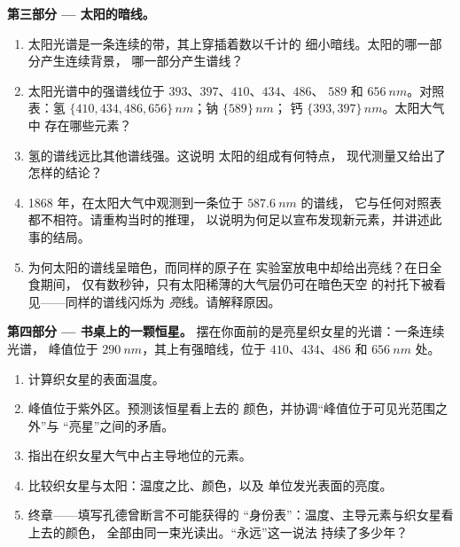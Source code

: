 \begin{problem}
\medskip
\noindent\textbf{第三部分 --- 太阳的暗线。}
\begin{enumerate}[resume]
  \item 太阳光谱是一条连续的带，其上穿插着数以千计的
        细小暗线。太阳的哪一部分产生连续背景，
        哪一部分产生谱线？
  \item 太阳光谱中的强谱线位于 $393$、$397$、$410$、$434$、$486$、
        $589$ 和 $\qty{656}{nm}$。对照表：氢
        $\{410, 434, 486, 656\}\,\unit{nm}$；钠 $\{589\}\,\unit{nm}$；
        钙 $\{393, 397\}\,\unit{nm}$。太阳大气中
        存在哪些元素？
  \item 氢的谱线远比其他谱线强。这说明
        太阳的组成有何特点，
        现代测量又给出了怎样的结论？
  \item 1868 年，在太阳大气中观测到一条位于 $\qty{587.6}{nm}$ 的谱线，
        它与任何对照表都不相符。请重构当时的推理，
        以说明为何足以宣布发现新元素，并讲述此事的结局。
  \item 为何太阳的谱线呈暗色，而同样的原子在
        实验室放电中却给出亮线？在日全食期间，
        仅有数秒钟，只有太阳稀薄的大气层仍可在暗色天空
        的衬托下被看见——同样的谱线闪烁为
        \emph{亮}线。请解释原因。
\end{enumerate}

\medskip
\noindent\textbf{第四部分 --- 书桌上的一颗恒星。}
摆在你面前的是亮星织女星的光谱：一条连续光谱，
峰值位于 $\qty{290}{nm}$，其上有强暗线，位于
$410$、$434$、$486$ 和 $\qty{656}{nm}$ 处。
\begin{enumerate}[resume]
  \item 计算织女星的表面温度。
  \item 峰值位于紫外区。预测该恒星看上去的
        颜色，并协调“峰值位于可见光范围之外”与
        “亮星”之间的矛盾。
  \item 指出在织女星大气中占主导地位的元素。
  \item 比较织女星与太阳：温度之比、颜色，以及
        单位发光表面的亮度。
  \item 终章——填写孔德曾断言不可能获得的
        “身份表”：温度、主导元素与织女星看上去的颜色，
        全部由同一束光读出。“永远”这一说法
        持续了多少年？
\end{enumerate}
\end{problem}
